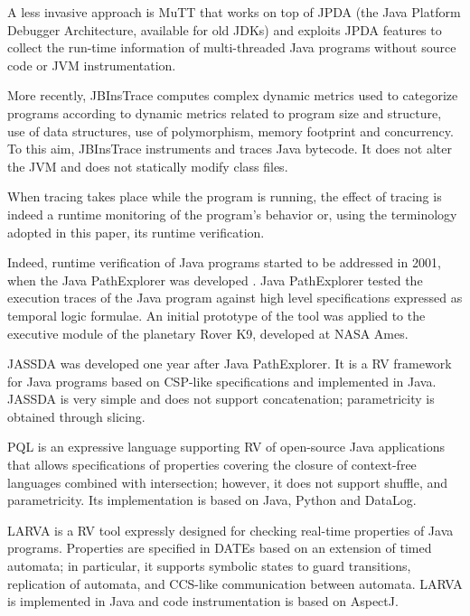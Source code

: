 A less invasive approach is MuTT \cite{DBLP:conf/ACISicis/LiuX09} that works on top of JPDA (the Java Platform Debugger Architecture, available for old JDKs) and exploits JPDA features to collect the run-time information of multi-threaded Java programs without source code or JVM instrumentation.

More recently, JBInsTrace \cite{DBLP:journals/scp/CasertaZ14} computes complex dynamic metrics used to categorize programs according to dynamic metrics related to program size and structure, use of data structures, use of
polymorphism, memory footprint and concurrency. 
To this aim, JBInsTrace instruments and traces Java bytecode. It does not alter the JVM and does not statically modify class files. 

When tracing takes place while the program is running, the effect of tracing is indeed a runtime monitoring of the program's behavior or, using the terminology adopted in this paper, its runtime verification.

Indeed, runtime verification of Java programs started to be addressed in 2001, when the Java PathExplorer was developed \cite{havelund2001java}. Java PathExplorer tested the execution traces of the Java program against high level specifications expressed as temporal logic formulae. An initial prototype of the tool was applied to the executive module of the planetary Rover K9, developed at NASA Ames. 

JASSDA \cite{BrorkensM02} was developed one year after Java PathExplorer. It is a RV framework for Java programs
based on CSP-like specifications and implemented in Java. JASSDA is very simple and does not support concatenation; parametricity
is obtained through slicing. 

PQL \cite{MartinLL05}  is an expressive language supporting RV of open-source Java
applications that allows specifications of properties covering the closure of context-free languages combined with intersection;
however, it does not support shuffle, and parametricity.  Its implementation is based on Java, Python and DataLog. 


LARVA \cite{ColomboPS09} is a RV tool expressly designed for checking real-time properties of Java programs.
Properties are specified in DATEs \cite{DATEs}
based on an extension of timed automata; in particular, it supports
symbolic states to guard transitions, replication of automata, and 
CCS-like communication between automata. LARVA is implemented in Java and code instrumentation is based on AspectJ.

